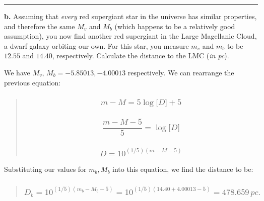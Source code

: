 \documentclass[
]{article}
\begin{document}
\begin{center}\rule{0.5\linewidth}{0.5pt}\end{center}

\textbf{b.} Assuming that \emph{every} red supergiant star in the
universe has similar properties, and therefore the same {\(M_{v}\)} and
{\(M_{b}\)} (which happens to be a relatively good assumption), you now
find another red supergiant in the Large Magellanic Cloud, a dwarf
galaxy orbiting our own. For this star, you measure {\(m_{v}\)} and
{\(m_{b}\)} to be {\(12.55\)} and {\(14.40\)}, respectively. Calculate
the distance to the LMC (\emph{in pc}).

We have {\(M_{v},\, M_{b} = - 5.85013, - 4.00013\)} respectively. We can
rearrange the previous equation:

\begin{quote}
\hypertarget{m---m-5loglbrack-drbrack-5}{%
\subsubsection{\texorpdfstring{{\[m - M = 5\log\lbrack D\rbrack + 5\]}}{m - M = 5\textbackslash log\textbackslash lbrack D\textbackslash rbrack + 5}}\label{m---m-5loglbrack-drbrack-5}}

\hypertarget{fracm---m---55-loglbrack-drbrack}{%
\subsubsection{\texorpdfstring{{\[\frac{m - M - 5}{5} = \log\lbrack D\rbrack\]}}{\textbackslash frac\{m - M - 5\}\{5\} = \textbackslash log\textbackslash lbrack D\textbackslash rbrack}}\label{fracm---m---55-loglbrack-drbrack}}

\hypertarget{d-1015m---m---5}{%
\subsubsection{\texorpdfstring{{\[D = 10^{(1/5)(m - M - 5)}\]}}{D = 10\^{}\{(1/5)(m - M - 5)\}}}\label{d-1015m---m---5}}
\end{quote}

Substituting our values for {\(m_{b},M_{b}\)} into this equation, we
find the distance to be:

\begin{quote}
\hypertarget{d_b-1015m_b---m_b---5-101514.40-4.00013---5-478.659-pc.}{%
\subsubsection{\texorpdfstring{{\[D_{b} = 10^{(1/5)(m_{b} - M_{b} - 5)} = 10^{(1/5)(14.40 + 4.00013 - 5)} = 478.659\, pc.\]}}{D\_\{b\} = 10\^{}\{(1/5)(m\_\{b\} - M\_\{b\} - 5)\} = 10\^{}\{(1/5)(14.40 + 4.00013 - 5)\} = 478.659\textbackslash, pc.}}\label{d_b-1015m_b---m_b---5-101514.40-4.00013---5-478.659-pc.}}
\end{quote}
\end{document}
